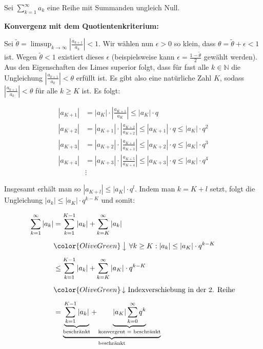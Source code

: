 \documentclass[fontsize=9pt,
               parskip=half-,
               DIV=14,
               listof=chapterentry,
               tocflat]{scrbook}
\newenvironment{indentblock}{\begin{adjustwidth}{.5cm}{}}{\end{adjustwidth}}
\newcommand{\proofstep}[1]{\textbf{\textcolor{sblau}{#1}}}
\begin{document}
\begin{proof*}
Sei $\sum _{k=1}^{\infty }a_{k}$ eine Reihe mit Summanden ungleich Null.

\proofstep{Konvergenz mit dem Quotientenkriterium:}
 \begin{indentblock}
Sei ${\tilde {\theta }}=\limsup _{k\to \infty }\left|{\tfrac {a_{k+1}}{a_{k}}}\right|<1$. Wir wählen nun $\epsilon >0$ so klein, dass $\theta ={\tilde {\theta }}+\epsilon <1$ ist. Wegen ${\tilde {\theta }}<1$ existiert dieses $\epsilon $ (beispielsweise kann $\epsilon ={\tfrac {1-{\tilde {\theta }}}{2}}$ gewählt werden). Aus den Eigenschaften des Limes superior folgt, dass für fast alle $k\in \mathbb {N} $ die Ungleichung $\left|{\tfrac {a_{k+1}}{a_{k}}}\right|<\theta $ erfüllt ist. Es gibt also eine natürliche Zahl $K$, sodass $\left|{\tfrac {a_{k+1}}{a_{k}}}\right|<\theta $ für alle $k\geq K$ ist. Es folgt:

\begin{align*}
|a_{K+1}|&=|a_{K}|\cdot \left|{\frac {a_{K+1}}{a_{K}}}\right|\leq |a_{K}|\cdot q\\[0.5em]|a_{K+2}|&=|a_{K+1}|\cdot \left|{\frac {a_{K+2}}{a_{K+2}}}\right|\leq |a_{K+1}|\cdot q\leq |a_{K}|\cdot q^{2}\\[0.5em]|a_{K+3}|&=|a_{K+2}|\cdot \left|{\frac {a_{K+4}}{a_{K+3}}}\right|\leq |a_{K+2}|\cdot q\leq |a_{K}|\cdot q^{3}\\[0.5em]|a_{K+4}|&=|a_{K+3}|\cdot \left|{\frac {a_{K+5}}{a_{K+4}}}\right|\leq |a_{K+3}|\cdot q\leq |a_{K}|\cdot q^{4}\\[0.5em]&\vdots 
\end{align*}

Insgesamt erhält man so $|a_{K+l}|\leq |a_{K}|\cdot q^{l}$. Indem man $k=K+l$ setzt, folgt die Ungleichung $|a_{k}|\leq |a_{K}|\cdot q^{k-K}$ und somit:

\begin{align*}
\sum _{k=1}^{\infty }|a_{k}|&=\sum _{k=1}^{K-1}|a_{k}|+\sum _{k=K}^{\infty }|a_{k}|\\[0.5em]&{\color {OliveGreen}\left\downarrow \ \forall k\geq K:|a_{k}|\leq |a_{K}|\cdot q^{k-K}\right.}\\[0.5em]&\leq \sum _{k=1}^{K-1}|a_{k}|+\sum _{k=K}^{\infty }|a_{K}|\cdot q^{k-K}\\[0.5em]&{\color {OliveGreen}\left\downarrow \ {\text{Indexverschiebung in der 2. Reihe}}\right.}\\[0.5em]&=\underbrace {\underbrace {\sum _{k=1}^{K-1}|a_{k}|} _{\text{beschränkt}}+\underbrace {|a_{K}|\sum _{k=0}^{\infty }q^{k}} _{\text{konvergent = beschränkt}}} _{\text{beschränkt}}\\[0.5em]
\end{align*}


\end{indentblock}
\end{proof*}
\end{document}
